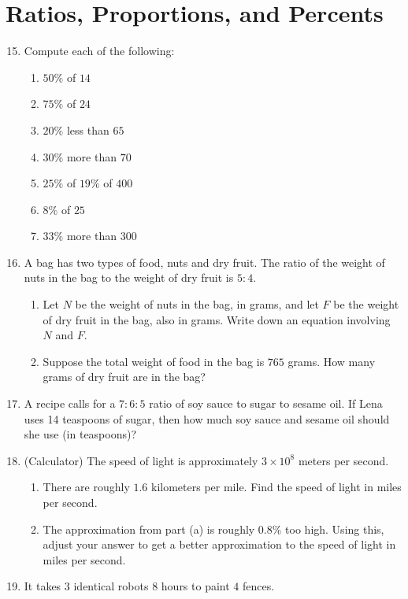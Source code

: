 \documentclass{article}
\begin{document}
\newpage
\section{Ratios, Proportions, and Percents}

\begin{enumerate}
\setcounter{enumi}{14}
\item Compute each of the following:
\begin{enumerate}
\item $50\%$ of $14$
\item $75\%$ of $24$
\item $20\%$ less than $65$
\item $30\%$ more than $70$
\item $25\%$ of $19\%$ of $400$
\item $8\%$ of $25$
\item $33\%$ more than $300$
\end{enumerate}
\item A bag has two types of food, nuts and dry fruit. The ratio of the weight of nuts in the bag to the weight of dry fruit is $5:4$.
\begin{enumerate}
\item Let $N$ be the weight of nuts in the bag, in grams, and let $F$ be the weight of dry fruit in the bag, also in grams. Write down an equation involving $N$ and $F$.
\item Suppose the total weight of food in the bag is $765$ grams. How many grams of dry fruit are in the bag?
\end{enumerate}
\item A recipe calls for a $7:6:5$ ratio of soy sauce to sugar to sesame oil. If Lena uses 14 teaspoons of sugar, then how much soy sauce and sesame oil should she use (in teaspoons)?
\item (Calculator) The speed of light is approximately $3\times 10^8$ meters per second.
\begin{enumerate}
\item There are roughly $1.6$ kilometers per mile. Find the speed of light in miles per second.
\item The approximation from part (a) is roughly $0.8\%$ too high. Using this, adjust your answer to get a better approximation to the speed of light in miles per second.
\end{enumerate}
\item It takes $3$ identical robots $8$ hours to paint $4$ fences.
\begin{enumerate}

\end{enumerate}
\end{enumerate}
\end{document}
